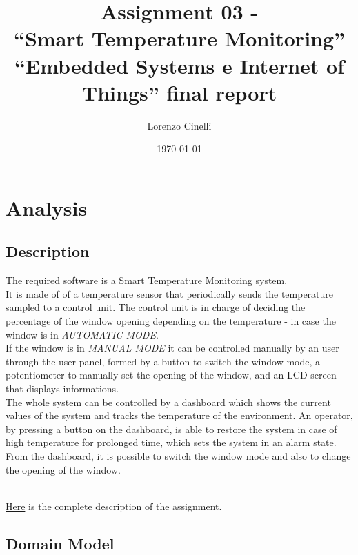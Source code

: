 \documentclass[a4paper,12pt]{report}
\title{Assignment 03 - \\``Smart Temperature Monitoring''\\
    \large ``Embedded Systems e Internet of Things'' final report}
\author{Lorenzo Cinelli}
\date{\today}
\begin{document}
\maketitle

\tableofcontents

\chapter{Analysis}

    \section{Description}
        The required software is a Smart Temperature Monitoring system.\\
        It is made of of a temperature sensor that periodically sends the temperature sampled to a control unit.
        The control unit is in charge of deciding the percentage of the window opening depending on the temperature -
        in case the window is in \textit{AUTOMATIC MODE}. \\
        If the window is in \textit{MANUAL MODE} it can be controlled manually by an user through the user panel,
        formed by a button to switch the window mode, a potentiometer to manually set the opening of the window,
        and an LCD screen that displays informations.\\
        The whole system can be controlled by a dashboard which shows the current values of the system and tracks
        the temperature of the environment.
        An operator, by pressing a button on the dashboard, is able to restore the system in case of high temperature for prolonged time, which sets the system in an alarm state.
        From the dashboard, it is possible to switch the window mode and also to change the opening of the window.\\\\
        \centerline{\href{https://docs.google.com/document/d/1bQZ4LNd35CGHn0wV8lqoz_GF4CWnNGBrRnF0vuKWUDI/edit?usp=sharing}{Here}
        is the complete description of the assignment.}

    \section{Domain Model}
\end{document}
